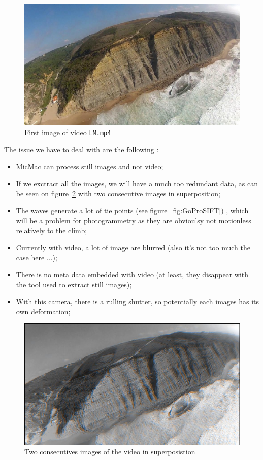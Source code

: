 \begin{figure}
\centering
\includegraphics[width=0.8\linewidth]{FIGS/GoProVideo/Im1Ok.jpg}
\caption{First image of video  {\tt LM.mp4}}
\label{fig:GoProIm1}
\end{figure}


The issue we have to deal with are the following :

\begin{itemize}
   \item MicMac can process still images and not video;
   \item If we exctract all the images, we will have a much too redundant data, as can be seen
         on figure~\ref{fig:GoProCloseWave} with two consecutive images in superposition;
   \item The waves generate a lot of tie points (see figure~\ref{fig:GoProSIFT}) , which will be 
         a problem for photogrammetry as  they are 
         obvioulsy not motionless relatively to the climb;
          
   \item Currently with video, a lot of image are blurred (also it's not too much the case here ...);
   \item  There is no meta data embedded with video (at least, they disappear with the tool used to extract
          still images);
   \item  With this camera, there is a rulling shutter, so potentially each images has its own deformation;
\end{itemize}


\begin{figure}
\centering
\includegraphics[width=0.80\linewidth]{FIGS/GoProVideo/Proches.jpg}
\caption{Two consecutives images of the video in superposistion}
\label{fig:GoProCloseWave}
\end{figure}


